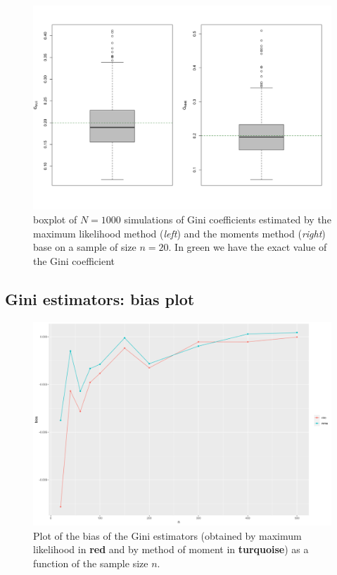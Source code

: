 \begin{figure}[H]
  \centering
  \includegraphics[width=\textwidth]{figures/png/gini_sample_boxplot.png}
  \caption{boxplot of $N = 1000$ simulations of Gini coefficients estimated by the maximum likelihood method (\textit{left}) and the moments method (\textit{right}) base on a sample of size $n = 20$. In green we have the exact value of the Gini coefficient}
  \label{fig:gini-sample-boxplot-N=1000}
\end{figure}

\subsection{Gini estimators: bias plot}

\begin{figure}[H]
  \centering
  \includegraphics[width=\linewidth]{figures/png/gini_bias_plot.png}
  \caption{Plot of the bias of the Gini estimators (obtained by maximum likelihood in \textbf{red} and by method of moment in \textbf{turquoise}) as a function of the sample size $n$.}
  \label{fig:gini-estimators-bias-plot}
\end{figure}

